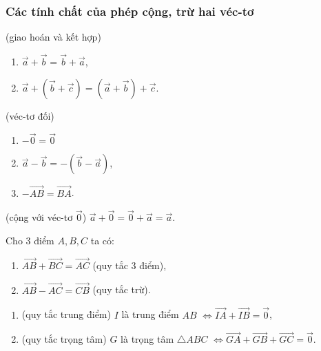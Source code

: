 \subsubsection{Các tính chất của phép cộng, trừ hai véc-tơ}
\begin{tc}
(giao hoán và kết hợp) \begin{multicols}{2}
\begin{enumerate}
	\item $\vec{a}+\vec{b}=\vec{b}+\vec{a}$,
	\item  $\vec{a}+(\vec{b}+\vec{c})=(\vec{a}+\vec{b})+\vec{c}$.
\end{enumerate}
\end{multicols}
\end{tc}
\begin{tc}(véc-tơ đối)
\begin{multicols}{3}
\begin{enumerate}
	\item  $-\vec{0}=\vec{0}$
	\item  $\vec{a}-\vec{b}=-(\vec{b}-\vec{a})$,
	\item $-\vec{AB}=\vec{BA}$.
\end{enumerate}
\end{multicols}
\end{tc}
\begin{tc}
(cộng với véc-tơ $\vec{0}$) $\vec{a}+\vec{0}=\vec{0}+\vec{a}=\vec{a}$.
\end{tc}
\begin{tc}
	 Cho $ 3 $ điểm $A,B,C$ ta có: \begin{multicols}{2}
\begin{enumerate}
	\item $\vec{AB}+\vec{BC}=\vec{AC}$ (quy tắc 3 điểm),  
	\item $\vec{AB}-\vec{AC}=\vec{CB}$ (quy tắc trừ).
\end{enumerate}
	 \end{multicols}
\end{tc}
\begin{tc}
		\begin{enumerate}
		\item (quy tắc trung điểm) $ I $ là trung điểm $ AB $ $\Leftrightarrow \overrightarrow{IA}+\overrightarrow{IB}=\overrightarrow{0}$,
		\item (quy tắc trọng tâm) $ G $ là trọng tâm $\triangle ABC$ $\Leftrightarrow \overrightarrow{GA}+\overrightarrow{GB}+\overrightarrow{GC}=\overrightarrow{0}$.
	\end{enumerate}
\end{tc}

